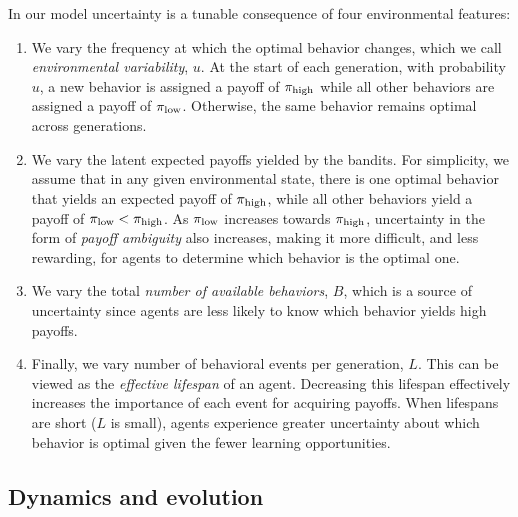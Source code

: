 \documentclass[letterpaper,11.5pt]{scrartcl}
\begin{document}
In our model uncertainty is a tunable consequence of four environmental features:
\begin{enumerate}
    \item 
      We vary the frequency at which the optimal behavior changes, which we call
      \emph{environmental variability}, $u$. At the start of each generation, with
      probability $u$, a new behavior is assigned a payoff of $\pi_{\mathrm{high}}$ while all
      other behaviors are assigned a payoff of $\pi_{\mathrm{low}}$. Otherwise, the same
      behavior remains optimal across generations. 
    \item We vary the latent expected payoffs yielded by the bandits. For simplicity,
      we assume that in any given environmental state, there is one optimal behavior that
      yields an expected payoff of $\pi_{\mathrm{high}}$, while all other behaviors yield a 
      payoff of $\pi_{\mathrm{low}} < \pi_{\mathrm{high}}$. As $\pi_{\mathrm{low}}$ increases towards 
      $\pi_{\mathrm{high}}$, uncertainty in the form of \emph{payoff ambiguity} also increases,
      making it more difficult, and less rewarding, for agents to determine which
      behavior is the optimal one.
    \item We vary the total \emph{number of available behaviors}, $B$, which is a
      source of uncertainty since agents are less likely to know which behavior yields high payoffs.  
    \item Finally, we vary number of behavioral events per generation, $L$. This can be viewed as the \emph{effective lifespan} of an agent.  Decreasing this lifespan effectively increases the importance of each event for acquiring payoffs. When lifespans are short ($L$ is small), agents experience greater uncertainty about which behavior is optimal given the fewer learning opportunities.
\end{enumerate}

\subsection{Dynamics and evolution}
\end{document}
